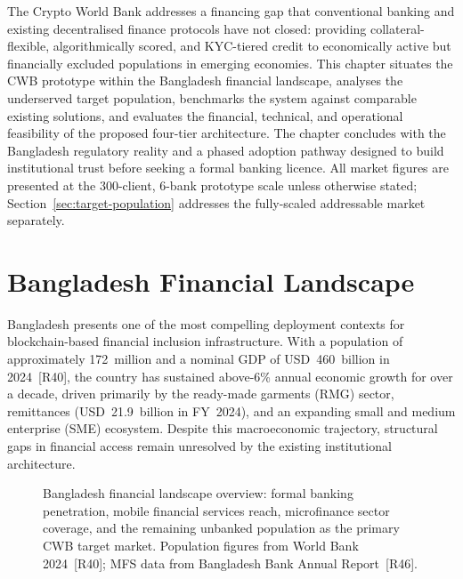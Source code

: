 The Crypto World Bank addresses a financing gap that conventional banking and
existing decentralised finance protocols have not closed: providing
collateral-flexible, algorithmically scored, and KYC-tiered credit to
economically active but financially excluded populations in emerging economies.
This chapter situates the CWB prototype within the Bangladesh financial
landscape, analyses the underserved target population, benchmarks the system
against comparable existing solutions, and evaluates the financial, technical,
and operational feasibility of the proposed four-tier architecture. The chapter
concludes with the Bangladesh regulatory reality and a phased adoption pathway
designed to build institutional trust before seeking a formal banking licence.
All market figures are presented at the 300-client, 6-bank prototype scale
unless otherwise stated; Section~\ref{sec:target-population} addresses the
fully-scaled addressable market separately.

\section{Bangladesh Financial Landscape}
\label{sec:bangladesh-landscape}

Bangladesh presents one of the most compelling deployment contexts for
blockchain-based financial inclusion infrastructure. With a population of
approximately 172~million and a nominal GDP of USD~460~billion in 2024~[R40],
the country has sustained above-6\% annual economic growth for over a decade,
driven primarily by the ready-made garments (RMG) sector, remittances
(USD~21.9~billion in FY~2024), and an expanding small and medium enterprise
(SME) ecosystem. Despite this macroeconomic trajectory, structural gaps in
financial access remain unresolved by the existing institutional architecture.

\begin{figure}[H]
\centering
{}
\caption{Bangladesh financial landscape overview: formal banking penetration,
mobile financial services reach, microfinance sector coverage, and the
remaining unbanked population as the primary CWB target market. Population
figures from World Bank 2024~[R40]; MFS data from Bangladesh Bank Annual
Report~[R46].}
\label{fig:bangladesh-market}
\end{figure}

